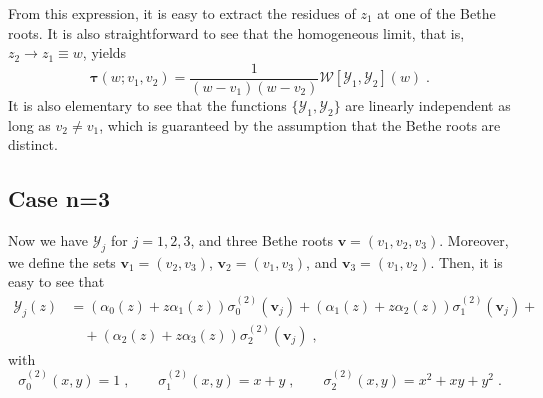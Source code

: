\documentclass[a4paper,12pt]{amsart}
\begin{document}
From this expression, it is easy to extract the residues of \(z_1\) at
one of the Bethe roots. It is also straightforward to see that the
homogeneous limit, that is, \(z_2 \to z_1 \equiv w\), yields
\begin{equation}
  \bm{\tau}(w; v_1 , v_2) =
  \frac{1}{(w- v_1)(w- v_2)}\mathcal{W}[\mathcal{Y}_1, \mathcal{Y}_2](w)\; . 
\end{equation}
It is also elementary to see that the functions \(\{\mathcal{Y}_1,
\mathcal{Y}_2\}\) are linearly independent as long as \(v_2 \neq
v_1\), which is guaranteed by the assumption that the Bethe roots are
distinct.

\subsection{Case n=3}
Now we have \(\mathcal{Y}_j\) for \(j=1,2,3\), and three Bethe roots
\(\bm{v} = (v_1, v_2, v_3)\). Moreover, we define the sets \(\bm{v}_1
= (v_2, v_3)\), \(\bm{v}_2 = (v_1, v_3)\), and \(\bm{v}_3 = (v_1,
v_2)\). Then, it is easy to see that
\begin{equation}
\begin{split}
  \mathcal{Y}_j(z)
  & = (\alpha_0(z) + z \alpha_1(z))\sigma_0^{(2)}(\bm{v}_j)   + (\alpha_1(z) + z \alpha_2(z))\sigma_1^{(2)}(\bm{v}_j)  + \\
  & \quad + (\alpha_2(z) + z \alpha_3(z))\sigma_2^{(2)}(\bm{v}_j) \; ,
\end{split}
\end{equation}
with
\begin{equation}
  \sigma_0^{(2)}(x, y) = 1\; ,\qquad 
  \sigma_1^{(2)}(x, y) = x + y\; ,\qquad 
  \sigma_2^{(2)}(x, y) = x^2 + xy  + y^2\; . 
\end{equation}
\end{document}
